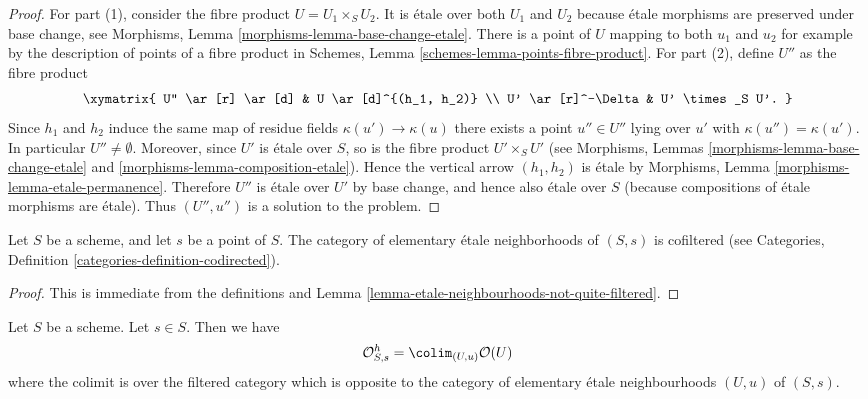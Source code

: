 \begin{proof}
For part (1), consider the fibre product $U = U_1 \times_S U_2$.
It is \'etale over both $U_1$ and $U_2$ because \'etale morphisms are
preserved under base change, see
Morphisms, Lemma \ref{morphisms-lemma-base-change-etale}.
There is a point of $U$ mapping to both $u_1$ and $u_2$ for example
by the description of points of a fibre product in
Schemes, Lemma \ref{schemes-lemma-points-fibre-product}.
For part (2), define $U''$ as the fibre product
$$
\xymatrix{
U'' \ar[r] \ar[d] & U \ar[d]^{(h_1, h_2)} \\
U' \ar[r]^-\Delta & U' \times_S U'.
}
$$
Since $h_1$ and $h_2$ induce the same map of residue fields
$\kappa(u') \to \kappa(u)$ there exists a point $u'' \in U''$
lying over $u'$ with $\kappa(u'') = \kappa(u')$.
In particular $U'' \not = \emptyset$.
Moreover, since $U'$ is \'etale over $S$, so is the fibre product
$U'\times_S U'$ (see
Morphisms, Lemmas \ref{morphisms-lemma-base-change-etale} and
\ref{morphisms-lemma-composition-etale}).
Hence the vertical arrow $(h_1, h_2)$ is \'etale by
Morphisms, Lemma \ref{morphisms-lemma-etale-permanence}.
Therefore $U''$ is \'etale over $U'$ by base change, and hence also
\'etale over $S$ (because compositions of \'etale morphisms are \'etale).
Thus $(U'', u'')$ is a solution to the problem.
\end{proof}

\begin{lemma}
\label{lemma-elementary-etale-neighbourhoods}
Let $S$ be a scheme, and let $s$ be a point of $S$.
The category of elementary \'etale neighborhoods of $(S, s)$
is cofiltered (see
Categories, Definition \ref{categories-definition-codirected}).
\end{lemma}

\begin{proof}
This is immediate from the definitions and
Lemma \ref{lemma-etale-neighbourhoods-not-quite-filtered}.
\end{proof}

\begin{lemma}
\label{lemma-describe-henselization}
Let $S$ be a scheme. Let $s \in S$. Then we have
$$
\mathcal{O}_{S, s}^h =
\colim_{(U, u)} \mathcal{O}(U)
$$
where the colimit is over the filtered category which is opposite to the
category of elementary \'etale neighbourhoods $(U, u)$ of $(S, s)$.
\end{lemma}

